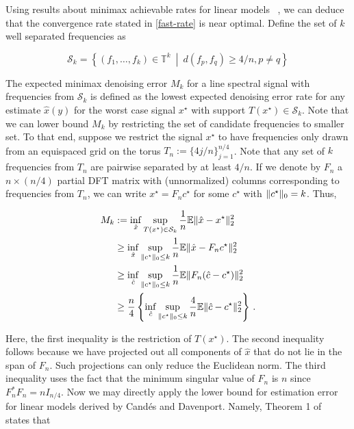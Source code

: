 Using results about minimax achievable rates for linear models~
\cite{cd_minimax,rw_minimax}, we can deduce that the convergence rate stated in
\eqref{fast-rate} is near optimal. Define the set of $k$ well separated
frequencies as

\[
\mathcal{S}_k = \left\{(f_1, \dots, f_k) \in \mathbb{T}^k ~\middle|~  d(f_p, f_q) \geq 4/n, p \neq q \right\}
\]

The expected minimax denoising error $M_k$ for a line spectral signal with
frequencies from $\mathcal{S}_k$ is defined as the lowest expected denoising
error rate for any estimate $\hat{x}(y)$ for the worst case signal $x^\star$
with support $T(x^\star) \in \mathcal{S}_k$. Note that we can lower bound $M_k$
by restricting the set of candidate frequencies to smaller set. To that end,
suppose we restrict the signal $x^\star$ to have frequencies only drawn from an
equispaced grid on the torus $T_n := \{ 4 j/n \}_{j=1}^{n/4}$. Note that any set
of $k$ frequencies from $T_n$ are pairwise separated by at least $4/n$. If we
denote by $F_n$ a $n \times (n/4)$ partial DFT matrix with (unnormalized)
columns corresponding to frequencies from $T_n$, we can write $x^\star = F_n
c^\star$ for some $c^\star$ with $\lVert c^\star\rVert_0 = k$. Thus,

\begin{align*}
M_k &:= \inf_{\hat{x}}
 \sup_{
	T(x^\star) \in \mathcal{S}_k}
\frac{1}{n} \mathbb{E} \lVert\hat{x} - x^\star\rVert_2^2
	\\
&\geq \inf_{\hat{x}} 
 \sup_{
	\lVert c^\star\rVert_0 \leq k
	} \frac{1}{n} \mathbb{E} \lVert\hat{x} - F_n c^\star\rVert_2^2\\
&\geq \inf_{\hat{c}}
 \sup_{\lVert c^\star\rVert_0 \leq k} \frac{1}{n} \mathbb{E} \lVert F_n(\hat{c} - c^\star)\rVert_2^2\\
&\geq  \frac{n}{4} \left\{ \inf_{\hat{c}}
 \sup_{\lVert c^\star\rVert_0 \leq k}\frac{4}{n} \mathbb{E} \lVert\hat{c} - c^\star\rVert_2^2\right\}\,.
\end{align*}

Here, the first inequality is the restriction of $T(x^\star)$. The second
inequality follows because we have projected out all components of $\hat{x}$
that do not lie in the span of $F_n$. Such projections can only reduce the
Euclidean norm. The third inequality uses the fact that the minimum singular
value of $F_n$ is $n$ since $F_n^*F_n = n I_{{n}/{4}}$. Now we may directly
apply the lower bound for estimation error for linear models derived by Cand\'es
and Davenport. Namely, Theorem 1 of~\cite{cd_minimax} states that

